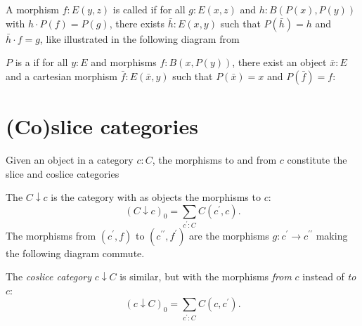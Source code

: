 \begin{definition}
  A morphism $ f: E(y, z) $ is called  if for all $ g: E(x, z) $ and $ h: B(P(x), P(y)) $ with $ h \cdot P(f) = P(g) $, there exists $ \bar h: E(x, y) $ such that $ P(\bar h) = h $ and $ \bar h \cdot f = g $, like illustrated in the following diagram from \cite{nlab:grothendieck_fibration}
  \begin{center}
  \end{center}
\end{definition}

\begin{definition}
  $ P $ is a  if for all $ y: E $ and morphisms $ f: B(x, P(y)) $, there exist an object $ \bar x: E $ and a cartesian morphism $ \bar f: E(\bar x, y) $ such that $ P(\bar x) = x $ and $ P(\bar f) = f $:
  \begin{center}
  \end{center}
\end{definition}

\section{(Co)slice categories}
Given an object in a category $ c: C $, the morphisms to and from $ c $ constitute the slice and coslice categories
\begin{definition}
  The  $ C \downarrow c $ is the category with as objects the morphisms to $ c $:
  \[ (C \downarrow c)_0 = \sum_{c^\prime: C} C(c^\prime, c). \]
  The morphisms from $ (c^\prime, f) $ to $ (c^{\prime\prime}, f^\prime) $ are the morphisms $ g: c^\prime \to c^{\prime\prime} $ making the following diagram commute.
  \begin{center}
  \end{center}
\end{definition}
The \textit{coslice category} $ c \downarrow C $ is similar, but with the morphisms \textit{from} $ c $ instead of \textit{to} $ c $:
\[ (c \downarrow C)_0 = \sum_{c^\prime: C} C(c, c^\prime). \]

